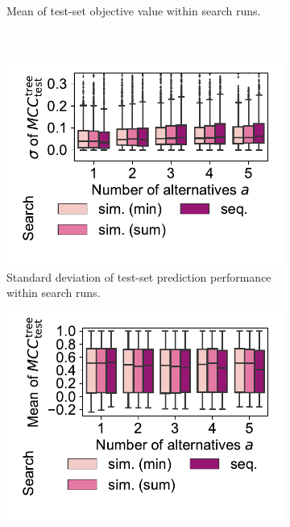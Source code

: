 \documentclass{article}
\theoremstyle{definition}
\begin{document}
\begin{figure}[p]
\begin{subfigure}[t]{0.48\textwidth}
		\caption{Mean of test-set objective value with\-in search runs.}
		\label{fig:afs:impact-search-mean-test-objective}
	\end{subfigure}
	\\ \vspace{\baselineskip}
	\begin{subfigure}[t]{0.48\textwidth}
		\centering
		\includegraphics[width=\textwidth, trim=15 25 15 5, clip]{plots/afs-impact-search-stddev-decision-tree-test-mcc.pdf}
		\caption{Standard deviation of test-set prediction performance within search runs.}
		\label{fig:afs:impact-search-stddev-decision-tree-test-mcc}
	\end{subfigure}
	\hfill
	\begin{subfigure}[t]{0.48\textwidth}
		\centering
		\includegraphics[width=\textwidth, trim=15 25 15 5, clip]{plots/afs-impact-search-mean-decision-tree-test-mcc.pdf}

\end{subfigure}
\end{figure}
\end{document}
